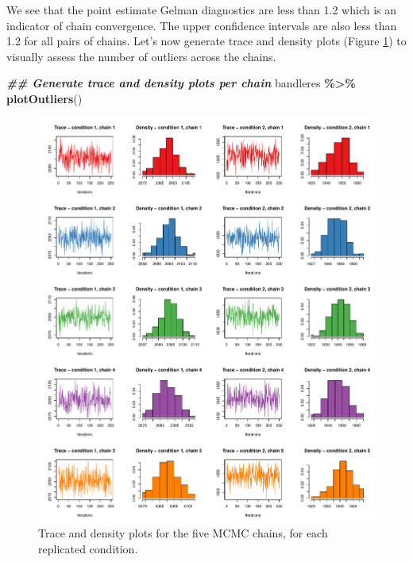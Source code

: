 \documentclass[9pt,a4paper,]{extarticle}
\newenvironment{Shaded}{\begin{snugshade}}{\end{snugshade}}
\newcommand{\DocumentationTok}[1]{\textcolor[rgb]{0.56,0.35,0.01}{\textbf{\textit{#1}}}}
\newcommand{\FunctionTok}[1]{\textcolor[rgb]{0.13,0.29,0.53}{\textbf{#1}}}
\newcommand{\NormalTok}[1]{#1}
\newcommand{\SpecialCharTok}[1]{\textcolor[rgb]{0.81,0.36,0.00}{\textbf{#1}}}
\begin{document}
We see that the point estimate Gelman diagnostics are less than 1.2 which is an
indicator of chain convergence. The upper confidence intervals are also
less than 1.2 for all pairs of chains. Let's now generate trace and density
plots (Figure \ref{fig:bandle-trace-dens}) to visually assess the number of outliers across the chains.

\begin{Shaded}
\begin{Highlighting}[]
\DocumentationTok{\#\# Generate trace and density plots per chain}
\NormalTok{bandleres }\SpecialCharTok{\%\textgreater{}\%}
  \FunctionTok{plotOutliers}\NormalTok{()}
\end{Highlighting}
\end{Shaded}

\begin{figure}[H]

{\centering \includegraphics[width=0.95\linewidth,]{figs/bandle_outliers} 

}

\caption{Trace and density plots for the five MCMC chains, for each replicated condition.}\label{fig:bandle-trace-dens}
\end{figure}
\end{document}
